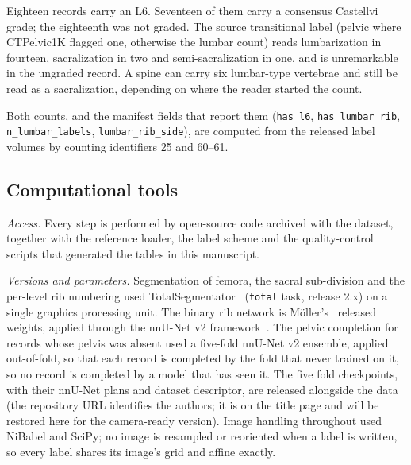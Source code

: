 \documentclass[aapm,mph,amsmath,amssymb,reprint]{revtex4-2}
\newif\ifreview \reviewtrue
\begin{document}
Eighteen records carry an L6. Seventeen of them carry a consensus Castellvi grade;
the eighteenth was not graded. The source transitional label (pelvic where CTPelvic1K flagged one, otherwise the lumbar count) reads lumbarization in fourteen, sacralization in two and semi-sacralization in one, and is unremarkable in the ungraded record. A spine can carry six lumbar-type vertebrae and still be read as a sacralization, depending on where the reader started the count.

\begin{sloppypar}
Both counts, and the manifest fields that report them (\texttt{has\_l6},
\texttt{has\_lumbar\_rib}, \texttt{n\_lumbar\_labels}, \texttt{lumbar\_rib\_side}), are
computed from the released label volumes by counting identifiers 25 and 60--61.
\end{sloppypar}

\subsection{Computational tools}

\emph{Access.} Every step is performed by open-source code archived with the dataset,
together with the reference loader, the label scheme and the quality-control scripts that
generated the tables in this manuscript.

\emph{Versions and parameters.} Segmentation of femora, the sacral sub-division and the
per-level rib numbering used TotalSegmentator~\cite{totalsegmentator} (\texttt{total} task,
release 2.x) on a single graphics processing unit. The binary rib network is
M\"oller's~\cite{moller2026} released weights, applied through the nnU-Net v2
framework~\cite{nnunet}. The pelvic completion for records whose pelvis was absent used a
five-fold nnU-Net v2 ensemble, applied out-of-fold, so that each record is completed by the fold that
never trained on it, so no record is completed by a model that has seen it. The five fold
checkpoints, with their nnU-Net plans and dataset descriptor, are released alongside the
data (\ifreview the repository URL identifies the authors; it is on the title page and will be
restored here for the camera-ready version\else\url{https://huggingface.co/OpenSpineConsortium/spinopelvic-seg-checkpoints}, trained with \url{https://github.com/Gregory-Schwing-MD-PhD/spinesurg-ct-nnunet} at commit 50b209f\fi). Image handling
throughout used NiBabel and SciPy; no image is resampled or reoriented when a label is
written, so every label shares its image's grid and affine exactly.
\end{document}
